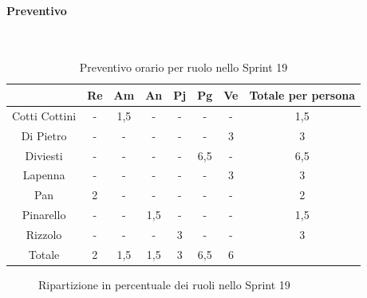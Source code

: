 \documentclass{article}
\begin{document}
            \paragraph{Preventivo}\mbox{}\\
            \begin{table}[H]
                \centering
                \begin{tabular}{|c|c|c|c|c|c|c|c|}
                \hline
                              & Re  & Am  & An  & Pj  & Pg  & Ve  & Totale per persona \\ \hline
                Cotti Cottini & -   & 1,5 & -   & -   & -   & -   & 1,5                \\ \hline
                Di Pietro     & -   & -   & -   & -   & -   & 3   & 3                  \\ \hline
                Diviesti      & -   & -   & -   & -   & 6,5 & -   & 6,5                \\ \hline
                Lapenna       & -   & -   & -   & -   & -   & 3   & 3                  \\ \hline
                Pan           & 2   & -   & -   & -   & -   & -   & 2                  \\ \hline
                Pinarello     & -   & -   & 1,5 & -   & -   & -   & 1,5                \\ \hline
                Rizzolo       & -   & -   & -   & 3   & -   & -   & 3                  \\ \hline
                Totale        & 2   & 1,5 & 1,5 & 3   & 6,5 & 6   &                    \\ \hline
                \end{tabular}
                \caption{Preventivo orario per ruolo nello Sprint 19}
            \end{table}


            \begin{figure}[H]
                \centering
                \caption{Ripartizione in percentuale dei ruoli nello Sprint 19}
            \end{figure}


\end{document}
